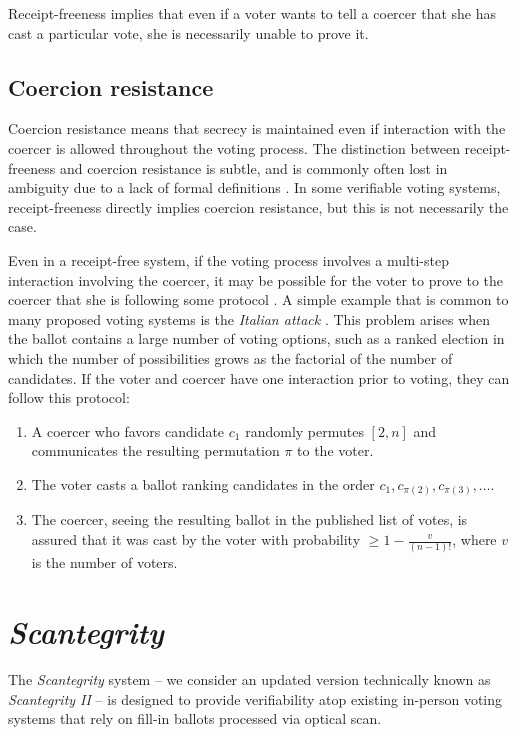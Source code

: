 \documentclass[10pt,twocolumn]{article}
\newcommand{\term}[1]{\textit{#1}}
\begin{document}
Receipt-freeness implies that even if a voter wants to tell a coercer that
she has cast a particular vote, she is necessarily unable to prove it.

\subsection{Coercion resistance}

Coercion resistance means that secrecy is maintained even if interaction
with the coercer is allowed throughout the voting process.
The distinction between receipt-freeness and coercion resistance is subtle,
and is commonly often lost in ambiguity due to a lack of formal definitions \cite{delaune}.
In some verifiable voting systems, receipt-freeness directly implies coercion resistance,
but this is not necessarily the case.

Even in a receipt-free system,
if the voting process involves a multi-step interaction involving the coercer,
it may be possible for the voter to prove to the coercer that she is following
some protocol \cite{delaune}.
A simple example that is common to many proposed voting systems is
the \term{Italian attack} \cite{preta}.
This problem arises when the ballot contains a large number of voting options,
such as a ranked election in which the number of possibilities grows as the
factorial of the number of candidates.
If the voter and coercer have one interaction prior to voting,
they can follow this protocol:
\begin{enumerate}
\item A coercer who favors candidate $c_1$ randomly permutes $[2, n]$ and
communicates the resulting permutation $\pi$ to the voter.
\item The voter casts a ballot ranking candidates in the order
$c_1, c_{\pi(2)}, c_{\pi(3)}, \ldots$.
\item The coercer, seeing the resulting ballot in the published list of votes,
is assured that it was cast by the voter with probability
$\ge 1 - \frac{v}{(n-1)!}$, where $v$ is the number of voters.
\end{enumerate}

\section{\term{Scantegrity}}

The \term{Scantegrity} system \cite{scantegrity_ii}
-- we consider an updated version technically known as \term{Scantegrity II} --
is designed to provide verifiability atop existing in-person voting systems that
rely on fill-in ballots processed via optical scan.
\end{document}
